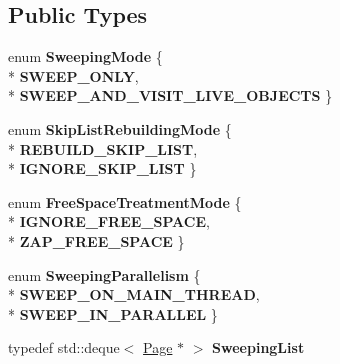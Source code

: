 \subsection*{Public Types}
\begin{DoxyCompactItemize}
\item 
enum {\bfseries Sweeping\+Mode} \{ \\*
{\bfseries S\+W\+E\+E\+P\+\_\+\+O\+N\+LY}, 
\\*
{\bfseries S\+W\+E\+E\+P\+\_\+\+A\+N\+D\+\_\+\+V\+I\+S\+I\+T\+\_\+\+L\+I\+V\+E\+\_\+\+O\+B\+J\+E\+C\+TS}
 \}\hypertarget{classv8_1_1internal_1_1_mark_compact_collector_1_1_sweeper_afe1b41e628e99a91ffaed56dff52a1f0}{}\label{classv8_1_1internal_1_1_mark_compact_collector_1_1_sweeper_afe1b41e628e99a91ffaed56dff52a1f0}

\item 
enum {\bfseries Skip\+List\+Rebuilding\+Mode} \{ \\*
{\bfseries R\+E\+B\+U\+I\+L\+D\+\_\+\+S\+K\+I\+P\+\_\+\+L\+I\+ST}, 
\\*
{\bfseries I\+G\+N\+O\+R\+E\+\_\+\+S\+K\+I\+P\+\_\+\+L\+I\+ST}
 \}\hypertarget{classv8_1_1internal_1_1_mark_compact_collector_1_1_sweeper_ad89d7b2bfb6031b10ef7808d5b59a693}{}\label{classv8_1_1internal_1_1_mark_compact_collector_1_1_sweeper_ad89d7b2bfb6031b10ef7808d5b59a693}

\item 
enum {\bfseries Free\+Space\+Treatment\+Mode} \{ \\*
{\bfseries I\+G\+N\+O\+R\+E\+\_\+\+F\+R\+E\+E\+\_\+\+S\+P\+A\+CE}, 
\\*
{\bfseries Z\+A\+P\+\_\+\+F\+R\+E\+E\+\_\+\+S\+P\+A\+CE}
 \}\hypertarget{classv8_1_1internal_1_1_mark_compact_collector_1_1_sweeper_adbacfa20f7833e3bd1c908628dc820f1}{}\label{classv8_1_1internal_1_1_mark_compact_collector_1_1_sweeper_adbacfa20f7833e3bd1c908628dc820f1}

\item 
enum {\bfseries Sweeping\+Parallelism} \{ \\*
{\bfseries S\+W\+E\+E\+P\+\_\+\+O\+N\+\_\+\+M\+A\+I\+N\+\_\+\+T\+H\+R\+E\+AD}, 
\\*
{\bfseries S\+W\+E\+E\+P\+\_\+\+I\+N\+\_\+\+P\+A\+R\+A\+L\+L\+EL}
 \}\hypertarget{classv8_1_1internal_1_1_mark_compact_collector_1_1_sweeper_a066d73fc3b1cc91243086492ad0334de}{}\label{classv8_1_1internal_1_1_mark_compact_collector_1_1_sweeper_a066d73fc3b1cc91243086492ad0334de}

\item 
typedef std\+::deque$<$ \hyperlink{classv8_1_1internal_1_1_page}{Page} $\ast$ $>$ {\bfseries Sweeping\+List}\hypertarget{classv8_1_1internal_1_1_mark_compact_collector_1_1_sweeper_abf083554d5c2ce0a779c65b299a25b0b}{}\label{classv8_1_1internal_1_1_mark_compact_collector_1_1_sweeper_abf083554d5c2ce0a779c65b299a25b0b}


\end{DoxyCompactItemize}
